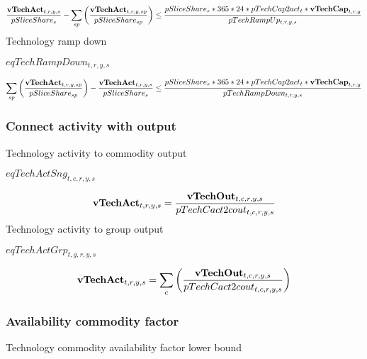 \documentclass{article}
\begin{document}
\begin{dmath} 
\frac{{\bf vTechAct}_{t,r,y,s}}{pSliceShare_{s}}-\sum_{sp}{\left(\frac{{\bf vTechAct}_{t,r,y,sp}}{pSliceShare_{sp}}\right)}  \le  \frac{pSliceShare_{s}*365*24*pTechCap2act_{t}*{\bf vTechCap}_{t,r,y}}{pTechRampUp_{t,r,y,s}}
\end{dmath} 
Technology ramp down







$eqTechRampDown_{t,r,y,s}$





\begin{dmath} 
\sum_{sp}{\left(\frac{{\bf vTechAct}_{t,r,y,sp}}{pSliceShare_{sp}}\right)}-\frac{{\bf vTechAct}_{t,r,y,s}}{pSliceShare_{s}}  \le  \frac{pSliceShare_{s}*365*24*pTechCap2act_{t}*{\bf vTechCap}_{t,r,y}}{pTechRampDown_{t,r,y,s}}
\end{dmath} 
\subsubsection*{Connect activity with output}
Technology activity to commodity output







$eqTechActSng_{t,c,r,y,s}$





\begin{dmath} 
{\bf vTechAct}_{t,r,y,s}  =  \frac{{\bf vTechOut}_{t,c,r,y,s}}{pTechCact2cout_{t,c,r,y,s}}
\end{dmath} 
Technology activity to group output







$eqTechActGrp_{t,g,r,y,s}$





\begin{dmath} 
{\bf vTechAct}_{t,r,y,s}  =  \sum_{c}{\left(\frac{{\bf vTechOut}_{t,c,r,y,s}}{pTechCact2cout_{t,c,r,y,s}}\right)}
\end{dmath} 
\subsubsection*{Availability commodity factor}
Technology commodity availability factor lower bound
\end{document}
